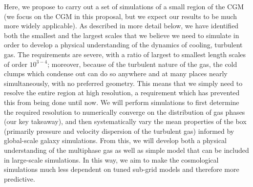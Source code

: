 \documentclass[11pt,letterpaper,english]{article}
\begin{document}
Here, we propose to carry out a set of simulations of a small region of the CGM (we focus on the CGM in this proposal, but we expect our results to be much more widely applicable).  As described in more detail below, we have identified both the smallest and the largest scales that we believe we need to simulate in order to develop a physical understanding of the dynamics of cooling, turbulent gas.  The requirements are severe, with a ratio of largest to smallest length scales of order $10^{3-4}$; moreover, because of the turbulent nature of the gas, the cold clumps which condense out can do so anywhere and at many places nearly simultaneously, with no preferred geometry.  This means that we simply need to resolve the entire region at high resolution, a requirement which has prevented this from being done until now.  We will perform simulations to first determine the required resolution to numerically converge on the distribution of gas phases (our key takeaway), and then systematically vary the mean properties of the box (primarily pressure and velocity dispersion of the turbulent gas) informed by global-scale galaxy simulations.  From this, we will develop both a physical understanding of the multiphase gas as well as simple model that can be included in large-scale simulations.  In this way, we aim to make the cosmological simulations much less dependent on tuned sub-grid models and therefore more predictive.








\end{document}
